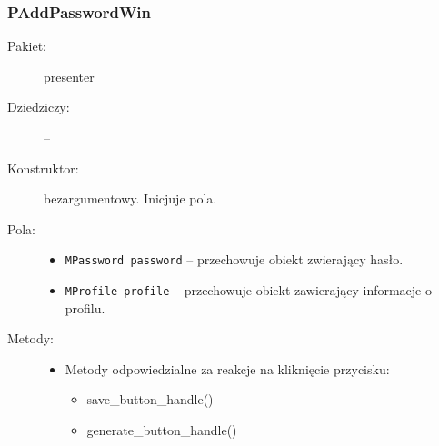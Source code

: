 \documentclass[a4paper]{article}
\newcommand{\prog}{\texttt}
\begin{document}
\subsubsection{PAddPasswordWin}
\begin{description}
    \item[Pakiet:] presenter
    \item[Dziedziczy:] --
    \item[Konstruktor:] bezargumentowy. Inicjuje pola.
    \item[Pola:] \hfill
    \begin{itemize}
        \item \prog{MPassword password} -- przechowuje obiekt zwierający hasło.
        \item \prog{MProfile profile} -- przechowuje obiekt zawierający informacje o profilu.
    \end{itemize}
    \item[Metody:] \hfill
    \begin{itemize}
        \item Metody odpowiedzialne za reakcje na kliknięcie przycisku:
        \begin{itemize}
            \item save\_button\_handle()
            \item generate\_button\_handle()
        \end{itemize}
    \end{itemize}
\end{description}
\end{document}
